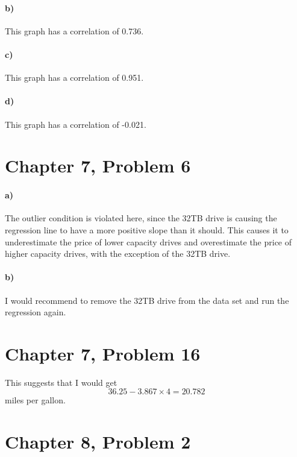 \documentclass[12pt]{article}
\begin{document}
\paragraph{b)}

This graph has a correlation of 0.736.

\paragraph{c)}

This graph has a correlation of 0.951.

\paragraph{d)}

This graph has a correlation of -0.021.

\section*{Chapter 7, Problem 6}

\paragraph{a)}

The outlier condition is violated here, since the 32TB drive is
causing the regression line to have a more positive slope than it should.
This causes it to underestimate the price of lower capacity drives and overestimate
the price of higher capacity drives, with the exception of the 32TB drive.

\paragraph{b)}

I would recommend to remove the 32TB drive from the data set and run the
regression again.

\section*{Chapter 7, Problem 16}

This suggests that I would get
\[36.25-3.867\times4=20.782\]
miles per gallon.

\section*{Chapter 8, Problem 2}
\end{document}
